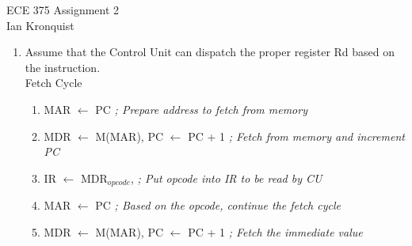 \documentclass[12pt,letterpaper]{article}
\begin{document}
\begin{flushright}
{\large
ECE 375 Assignment 2\\
Ian Kronquist
}
\end{flushright}

\bigskip

\begin{enumerate}
    \item Assume that the Control Unit can dispatch the proper register Rd
    based on the instruction.\\
    Fetch Cycle
    \begin{enumerate}[i]
        \item MAR $\leftarrow$ PC  \emph{; Prepare address to fetch from memory}
        \item MDR $\leftarrow$ M(MAR), PC $\leftarrow$ PC + 1  \emph{; Fetch from memory and increment PC}
        \item IR $\leftarrow$ MDR$_{opcode}$, \emph{; Put opcode into IR to be read by CU}
        \item MAR $\leftarrow$ PC \emph{; Based on the opcode, continue the fetch cycle}
        \item MDR $\leftarrow$ M(MAR), PC $\leftarrow$ PC + 1 \emph{; Fetch the immediate value}
    \end{enumerate}


\end{enumerate}
\end{document}

